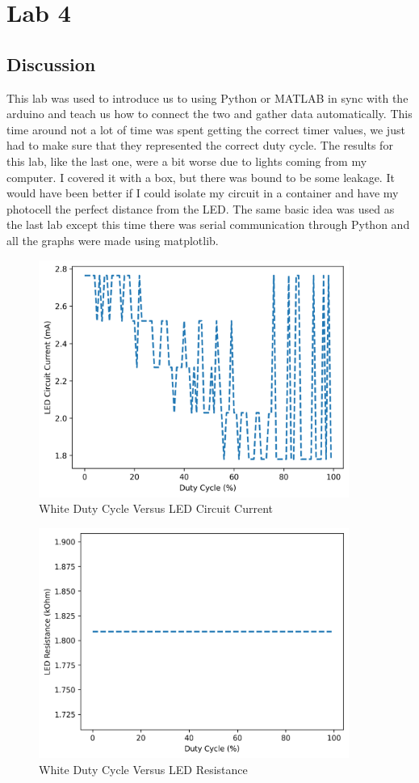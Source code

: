 \documentclass[12pt,titlepage]{article}
\begin{document}
\section{Lab 4}
\subsection{Discussion}
This lab was used to introduce us to using Python or MATLAB in sync with the arduino and teach us how to connect the two and gather data automatically.
This time around not a lot of time was spent getting the correct timer values, we just had to make sure that they represented the correct duty cycle.
The results for this lab, like the last one, were a bit worse due to lights coming from my computer. I covered it with a box, but there was bound to be some leakage.
It would have been better if I could isolate my circuit in a container and have my photocell the perfect distance from the LED. The same basic idea was used as the
last lab except this time there was serial communication through Python and all the graphs were made using matplotlib.
\begin{figure}[!htb]
    \centering
    \includegraphics[width=4in]{lab_4/white_duty_cycle_led_circuit_curr.png}
    \caption{White Duty Cycle Versus LED Circuit Current}\label{fig:white_lab_4_duty_cycle_led_circuit_curr}
\end{figure}
\begin{figure}[!htb]
    \centering
    \includegraphics[width=4in]{lab_4/white_duty_cycle_led_res.png}
    \caption{White Duty Cycle Versus LED Resistance}\label{fig:white_lab_4_duty_cycle_led_res}
\end{figure}
\end{document}
